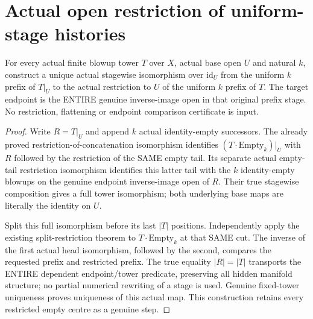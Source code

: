 \section{Actual open restriction of uniform-stage histories}

\begin{theorem}
\label{hir:sharp-actual-curve-uniform-prefix-open-restriction}
\leanok
For every actual finite blowup tower $T$ over $X$, actual base open $U$
and natural $k$, construct a unique actual stagewise isomorphism over
$\mathrm{id}_U$ from the uniform $k$ prefix of $T|_U$ to the actual
restriction to $U$ of the uniform $k$ prefix of $T$. The target endpoint
is the ENTIRE genuine inverse-image open in that original prefix stage.
No restriction, flattening or endpoint comparison certificate is input.
\end{theorem}
\begin{proof}
Write $R=T|_U$ and append $k$ actual identity-empty successors. The
already proved restriction-of-concatenation isomorphism identifies
$(T\cdot\mathrm{Empty}_k)|_U$ with $R$ followed by the restriction of
the SAME empty tail. Its separate actual empty-tail restriction
isomorphism identifies this latter tail with the $k$ identity-empty
blowups on the genuine endpoint inverse-image open of $R$. Their true
stagewise composition gives a full tower isomorphism; both underlying
base maps are literally the identity on $U$.

Split this full isomorphism before its last $|T|$ positions. Independently
apply the existing split-restriction theorem to $T\cdot\mathrm{Empty}_k$
at that SAME cut. The inverse of the first actual head isomorphism,
followed by the second, compares the requested prefix and restricted
prefix. The true equality $|R|=|T|$ transports the ENTIRE dependent
endpoint/tower predicate, preserving all hidden manifold structure;
no partial numerical rewriting of a stage is used. Genuine fixed-tower
uniqueness proves uniqueness of this actual map. This construction
retains every restricted empty centre as a genuine step.
\end{proof}

